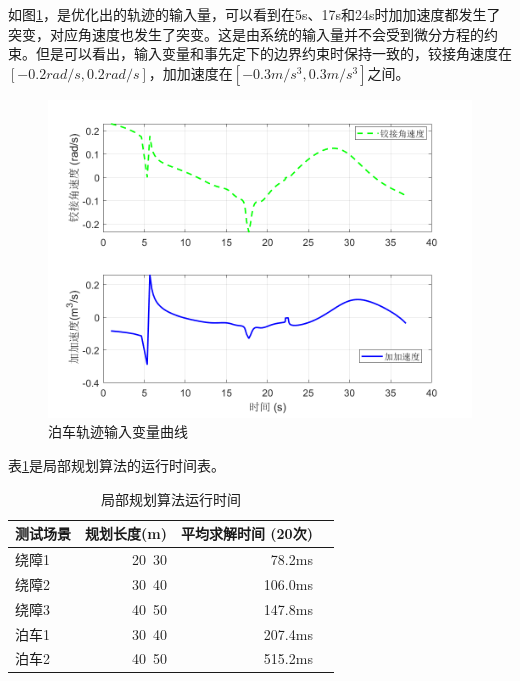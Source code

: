 \documentclass[master,academic]{ysuthesis} %
\begin{document}
		如图\ref{fig:databocheinput}，是优化出的轨迹的输入量，可以看到在5s、17s和24s时加加速度都发生了突变，对应角速度也发生了突变。这是由系统的输入量并不会受到微分方程的约束。但是可以看出，输入变量和事先定下的边界约束时保持一致的，铰接角速度在$[-0.2rad/s,0.2rad/s]$，加加速度在$[-0.3m/s^3,0.3m/s^3]$之间。
		\begin{figure}[!ht]
			\centering
			\includegraphics[width=1\textwidth]{databocheinput.png}
			\caption{泊车轨迹输入变量曲线}
			\label{fig:databocheinput}
		\end{figure}

		表\ref{tab:local_planning_boche_time}是局部规划算法的运行时间表。
		\begin{table}[!ht]
			\caption{局部规划算法运行时间}
			\label{tab:local_planning_boche_time}
			\centering
			\begin{tabular}{l rrr}
				\toprule
				测试场景   & 规划长度(m) & 平均求解时间 (20次) \\
				\midrule
				绕障1 & 20~30    & 78.2ms   \\
				绕障2 & 30~40    & 106.0ms  \\
				绕障3 & 40~50    & 147.8ms  \\
				泊车1  & 30~40   & 207.4ms  \\
				泊车2  & 40~50   & 515.2ms  \\
				\bottomrule
			\end{tabular}
		\end{table}
\end{document}
